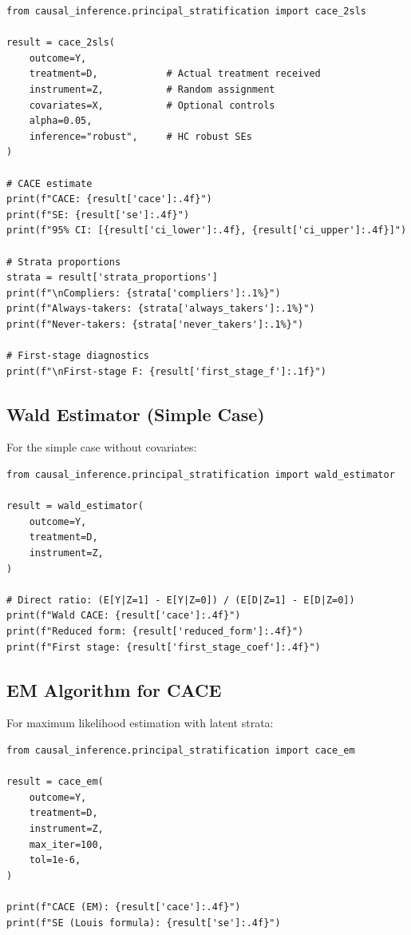 \begin{verbatim}
from causal_inference.principal_stratification import cace_2sls

result = cace_2sls(
    outcome=Y,
    treatment=D,            # Actual treatment received
    instrument=Z,           # Random assignment
    covariates=X,           # Optional controls
    alpha=0.05,
    inference="robust",     # HC robust SEs
)

# CACE estimate
print(f"CACE: {result['cace']:.4f}")
print(f"SE: {result['se']:.4f}")
print(f"95% CI: [{result['ci_lower']:.4f}, {result['ci_upper']:.4f}]")

# Strata proportions
strata = result['strata_proportions']
print(f"\nCompliers: {strata['compliers']:.1%}")
print(f"Always-takers: {strata['always_takers']:.1%}")
print(f"Never-takers: {strata['never_takers']:.1%}")

# First-stage diagnostics
print(f"\nFirst-stage F: {result['first_stage_f']:.1f}")
\end{verbatim}

\subsection{Wald Estimator (Simple Case)}

For the simple case without covariates:

\begin{verbatim}
from causal_inference.principal_stratification import wald_estimator

result = wald_estimator(
    outcome=Y,
    treatment=D,
    instrument=Z,
)

# Direct ratio: (E[Y|Z=1] - E[Y|Z=0]) / (E[D|Z=1] - E[D|Z=0])
print(f"Wald CACE: {result['cace']:.4f}")
print(f"Reduced form: {result['reduced_form']:.4f}")
print(f"First stage: {result['first_stage_coef']:.4f}")
\end{verbatim}

\subsection{EM Algorithm for CACE}

For maximum likelihood estimation with latent strata:

\begin{verbatim}
from causal_inference.principal_stratification import cace_em

result = cace_em(
    outcome=Y,
    treatment=D,
    instrument=Z,
    max_iter=100,
    tol=1e-6,
)

print(f"CACE (EM): {result['cace']:.4f}")
print(f"SE (Louis formula): {result['se']:.4f}")
\end{verbatim}

